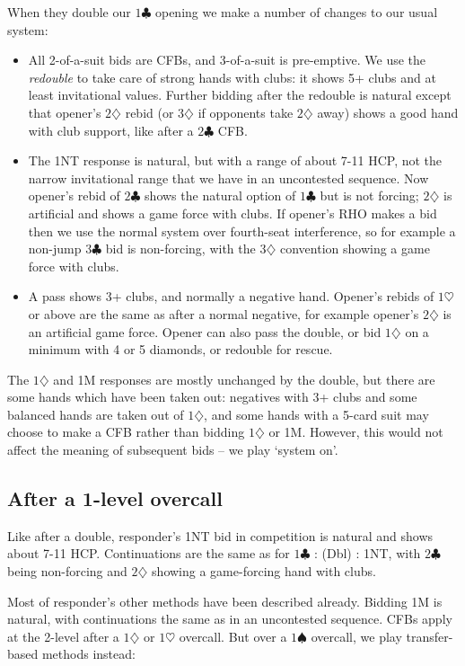 \documentclass{article}
\newcommand{\sz}{\spadesuit}
\newcommand{\hz}{\heartsuit}
\newcommand{\dz}{\diamondsuit}
\newcommand{\cz}{\clubsuit}
\begin{document}
When they double our $1\cz$ opening we make a number of changes to our usual system:
\begin{itemize}
\item All 2-of-a-suit bids are CFBs, and 3-of-a-suit is pre-emptive. We use the \emph{redouble} to take care of strong hands with clubs: it shows 5+ clubs and at least invitational values. Further bidding after the redouble is natural except that opener's $2\dz$ rebid (or $3\dz$ if opponents take $2\dz$ away) shows a good hand with club support, like after a $2\cz$ CFB.
\item The 1NT response is natural, but with a range of about 7-11 HCP, not the narrow invitational range that we have in an uncontested sequence. Now opener's rebid of $2\cz$ shows the natural option of $1\cz$ but is not forcing; $2\dz$ is artificial and shows a game force with clubs. If opener's RHO makes a bid then we use the normal system over fourth-seat interference, so for example a non-jump $3\cz$ bid is non-forcing, with the $3\dz$ convention showing a game force with clubs.
\item A pass shows 3+ clubs, and normally a negative hand. Opener's rebids of $1\hz$ or above are the same as after a normal negative, for example opener's $2\dz$ is an artificial game force. Opener can also pass the double, or bid $1\dz$ on a minimum with 4 or 5 diamonds, or redouble for rescue.
\end{itemize}
The $1\dz$ and 1M responses are mostly unchanged by the double, but there are some hands which have been taken out: negatives with 3+ clubs and some balanced hands are taken out of $1\dz$, and some hands with a 5-card suit may choose to make a CFB rather than bidding $1\dz$ or 1M. However, this would not affect the meaning of subsequent bids -- we play `system on'.


\subsection{After a 1-level overcall}

Like after a double, responder's 1NT bid in competition is natural and shows about 7-11 HCP. Continuations are the same as for $1\cz$ : (Dbl) : 1NT, with $2\cz$ being non-forcing and $2\dz$ showing a game-forcing hand with clubs.

Most of responder's other methods have been described already. Bidding 1M is natural, with continuations the same as in an uncontested sequence. CFBs apply at the 2-level after a $1\dz$ or $1\hz$ overcall. But over a $1\sz$ overcall, we play transfer-based methods instead:
\end{document}
